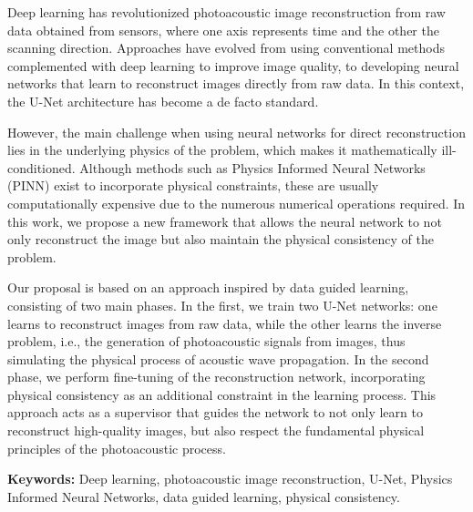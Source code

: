 Deep learning has revolutionized photoacoustic image reconstruction from raw data obtained from sensors, where one axis represents time and the other the scanning direction. Approaches have evolved from using conventional methods complemented with deep learning to improve image quality, to developing neural networks that learn to reconstruct images directly from raw data. In this context, the U-Net architecture has become a de facto standard.

However, the main challenge when using neural networks for direct reconstruction lies in the underlying physics of the problem, which makes it mathematically ill-conditioned. Although methods such as Physics Informed Neural Networks (PINN) exist to incorporate physical constraints, these are usually computationally expensive due to the numerous numerical operations required. In this work, we propose a new framework that allows the neural network to not only reconstruct the image but also maintain the physical consistency of the problem.

Our proposal is based on an approach inspired by data guided learning, consisting of two main phases. In the first, we train two U-Net networks: one learns to reconstruct images from raw data, while the other learns the inverse problem, i.e., the generation of photoacoustic signals from images, thus simulating the physical process of acoustic wave propagation. In the second phase, we perform fine-tuning of the reconstruction network, incorporating physical consistency as an additional constraint in the learning process. This approach acts as a supervisor that guides the network to not only learn to reconstruct high-quality images, but also respect the fundamental physical principles of the photoacoustic process.

\textbf{Keywords:} Deep learning, photoacoustic image reconstruction, U-Net, Physics Informed Neural Networks, data guided learning, physical consistency.